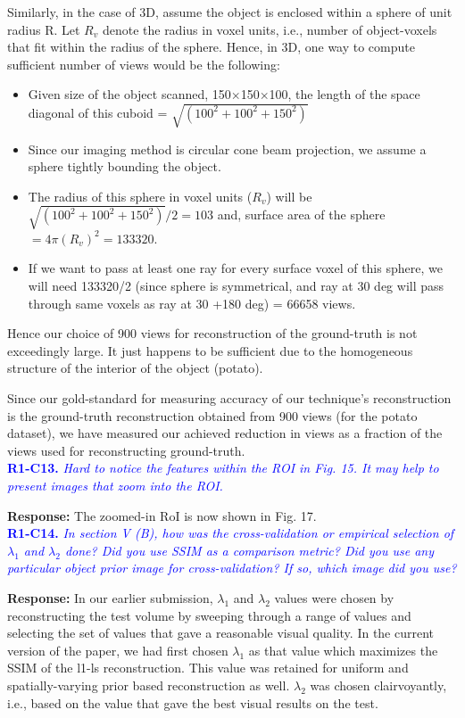 \documentclass{article}
\begin{document}
Similarly, in the case of 3D, assume the object is enclosed within a sphere of unit radius R. Let $R_v$ denote the radius in voxel units, i.e., number of object-voxels that fit within the radius of the sphere. Hence, in 3D, one way to compute sufficient number of views would be the following:
\begin{itemize}
\item Given size of the object scanned, 150$\times$150$\times$100, the length of the space diagonal of this cuboid = $\sqrt{(100^2 + 100^2 + 150^2)}$
\item Since our imaging method is circular cone beam projection, we assume a sphere tightly bounding the object.
\item The radius of this sphere in voxel units ($R_v$) will be $\sqrt{(100^2 + 100^2 + 150^2)}/2 = 103$
and, surface area of the sphere $= 4\pi (R_v)^2 = 133320$.
\item If we want to pass at least one ray for every surface voxel of this sphere, we will need 133320/2 (since sphere is symmetrical, and ray at 30 deg will pass through same voxels as ray at 30 +180 deg) = 66658 views. 
\end{itemize}
Hence our choice of 900 views for reconstruction of the ground-truth is not exceedingly large. It just happens to be sufficient due to the homogeneous structure of the interior of the object (potato).

Since our gold-standard for measuring accuracy of our technique's reconstruction is the ground-truth reconstruction obtained from 900 views (for the potato dataset), we have measured our achieved reduction in views as a fraction of the views used for reconstructing ground-truth. \\

\textcolor{blue}{\textbf{R1-C13.}\textit{ Hard to notice the features within the ROI in Fig. 15. It may help to present images that zoom into the ROI.}}
    
\textbf{Response:} The zoomed-in RoI is now shown in Fig. 17. \\

\textcolor{blue}{\textbf{R1-C14.}\textit{ In section V (B), how was the cross-validation or empirical selection of $\lambda_1$ and $\lambda_2$ done? Did you use SSIM as a comparison metric? Did you use any particular object prior image for cross-validation? If so, which image did you use? }}

\textbf{Response:} In our earlier submission, $\lambda_1$ and $\lambda_2$ values were chosen by reconstructing the test volume by sweeping through a range of values and selecting the set of values that gave a reasonable visual quality. In the current version of the paper, we had first chosen $\lambda_1$ as that value which maximizes the SSIM of the l1-ls reconstruction. This value was retained for uniform and spatially-varying prior based reconstruction as well. $\lambda_2$ was chosen clairvoyantly,  i.e., based on the value that gave the best visual results on the test.\\
\end{document}
